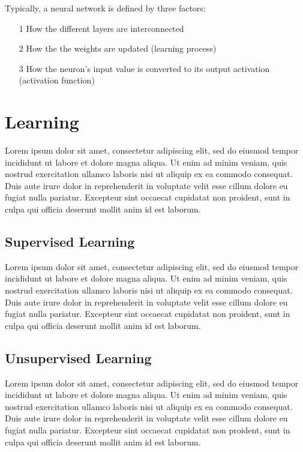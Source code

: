 \clearpage

\noindent Typically, a neural network is defined by three factors:
\begin{itemize}
    \item[1] How the different layers are interconnected
    \item[2] How the the weights are updated (learning process)
    \item[3] How the neuron's input value is converted to its output activation (activation function)
\end{itemize}



\section{Learning}
Lorem ipsum dolor sit amet, consectetur adipiscing elit, sed do eiusmod tempor incididunt ut labore et dolore magna aliqua. Ut enim ad minim veniam, quis nostrud exercitation ullamco laboris nisi ut aliquip ex ea commodo consequat. Duis aute irure dolor in reprehenderit in voluptate velit esse cillum dolore eu fugiat nulla pariatur. Excepteur sint occaecat cupidatat non proident, sunt in culpa qui officia deserunt mollit anim id est laborum. \\

\subsection{Supervised Learning}
Lorem ipsum dolor sit amet, consectetur adipiscing elit, sed do eiusmod tempor incididunt ut labore et dolore magna aliqua. Ut enim ad minim veniam, quis nostrud exercitation ullamco laboris nisi ut aliquip ex ea commodo consequat. Duis aute irure dolor in reprehenderit in voluptate velit esse cillum dolore eu fugiat nulla pariatur. Excepteur sint occaecat cupidatat non proident, sunt in culpa qui officia deserunt mollit anim id est laborum. \\

\subsection{Unsupervised Learning}
Lorem ipsum dolor sit amet, consectetur adipiscing elit, sed do eiusmod tempor incididunt ut labore et dolore magna aliqua. Ut enim ad minim veniam, quis nostrud exercitation ullamco laboris nisi ut aliquip ex ea commodo consequat. Duis aute irure dolor in reprehenderit in voluptate velit esse cillum dolore eu fugiat nulla pariatur. Excepteur sint occaecat cupidatat non proident, sunt in culpa qui officia deserunt mollit anim id est laborum. \\

